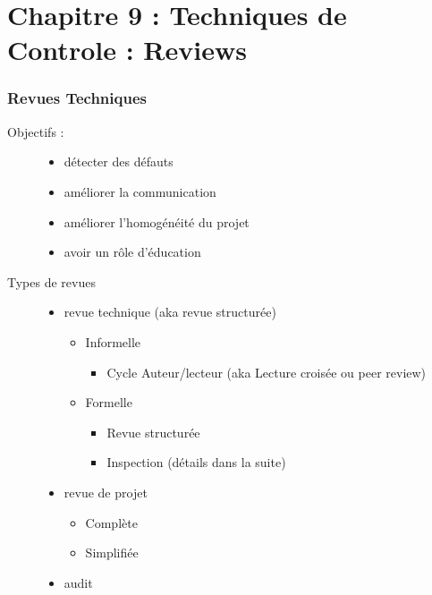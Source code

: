 \part{Chapitre 9 : Techniques de Controle : Reviews}

\section{Revues Techniques}

\begin{description}
\item[Objectifs :]
	\begin{itemize}
	\item détecter des défauts
	\item améliorer la communication
	\item améliorer l'homogénéité du projet
	\item avoir un rôle d'éducation
	\end{itemize}

\item[Types de revues]
	\begin{itemize}

	\item revue technique (aka revue structurée)
		\begin{itemize}

		\item Informelle
			\begin{itemize}

			\item Cycle Auteur/lecteur (aka Lecture croisée ou peer review)
			\end{itemize}

		\item Formelle
			\begin{itemize}

				\item Revue structurée
				\item Inspection (détails dans la suite)

			\end{itemize}
		\end{itemize}

	\item revue de projet
		\begin{itemize}

		\item Complète
		\item Simplifiée

		\end{itemize}

	\item audit

	\end{itemize}

\end{description}


